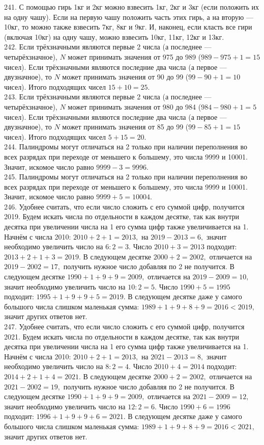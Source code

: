 241. С помощью гирь 1кг и 2кг можно взвесить 1кг, 2кг и 3кг (если положить их на одну чашу). Если на первую чашу положить часть этих гирь, а на вторую --- 10кг, то можно также взвесить 7кг, 8кг и 9кг. И, наконец, если класть все гири (включая 10кг) на одну чашу, можно взвесить 10кг, 11кг, 12кг и 13кг.\\
242. Если трёхзначными являются первые 2 числа (а последнее --- четырёхзначное), $N$ может принимать значения от 975 до 989 ($989-975+1=15$ чисел). Если трёхзначными являются последние два числа (а первое --- двузначное), то $N$ может принимать значения от 90 до 99 ($99-90+1=10$ чисел). Итого подходящих чисел $15+10=25.$\\
243. Если трёхзначными являются первые 2 числа (а последнее --- четырёхзначное), $N$ может принимать значения от 980 до 984 ($984-980+1=5$ чисел). Если трёхзначными являются последние два числа (а первое --- двузначное), то $N$ может принимать значения от 85 до 99 ($99-85+1=15$ чисел). Итого подходящих чисел $5+15=20.$\\
244. Палиндромы могут отличаться на 2 только при наличии переполнения во всех разрядах при переходе от меньшего к большему, это числа 9999 и 10001. Значит, искомое число равно $9999-3=9996.$\\
245. Палиндромы могут отличаться на 2 только при наличии переполнения во всех разрядах при переходе от меньшего к большему, это числа 9999 и 10001. Значит, искомое число равно $9999+5=10004.$\\
246. Удобнее считать, что если число сложить с его суммой цифр, получится 2019. Будем искать числа по отдельности в каждом десятке, так как внутри десятка при увеличении числа на 1 его сумма цифр также увеличивается на 1. Начнём с числа 2010: $2010+2+1=2013,$ на $2019-2013=6,$ значит необходимо увеличить число на $6:2=3.$ Число $2010+3=2013$ подходит: $2013+2+1+3=2019.$ В следующем десятке $2000+2=2002,$ отличается на $2019-2002=17,$ получить нужное число добавляя по 2 не получится. В следующем десятке $1990+1+9+9=2009,$ отличается на $2019-2009=10,$ значит необходимо увеличить число на $10:2=5.$ Число $1990+5=1995$ подходит: $1995+1+9+9+5=2019.$ В следующем десятке даже у самого большого числа слишком маленькая сумма: $1989+1+9+8+9=2016<2019,$ значит других ответов нет.\\
247. Удобнее считать, что если число сложить с его суммой цифр, получится 2021. Будем искать числа по отдельности в каждом десятке, так как внутри десятка при увеличении числа на 1 его сумма цифр также увеличивается на 1. Начнём с числа 2010: $2010+2+1=2013,$ на $2021-2013=8,$ значит необходимо увеличить число на $8:2=4.$ Число $2010+4=2014$ подходит: $2014+2+1+4=2021.$ В следующем десятке $2000+2=2002,$ отличается на $2021-2002=19,$ получить нужное число добавляя по 2 не получится. В следующем десятке $1990+1+9+9=2009,$ отличается на $2021-2009=12,$ значит необходимо увеличить число на $12:2=6.$ Число $1990+6=1996$ подходит: $1996+1+9+9+6=2021.$ В следующем десятке даже у самого большого числа слишком маленькая сумма: $1989+1+9+8+9=2016<2021,$ значит других ответов нет.\\
